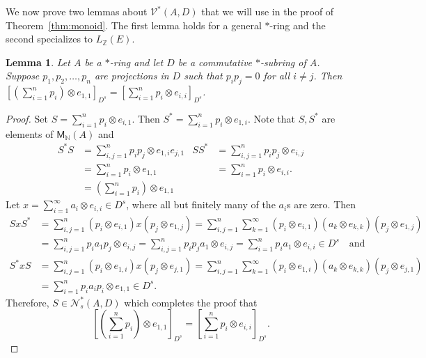 \documentclass[11pt, letterpaper,final]{amsart}
\newcommand{\ZZ}{\mathbb{Z}}
\newcommand{\NN}{\mathbb{N}}
\newcommand{\V}{\mathcal{V}}
\newtheorem{lem}[thm]{Lemma}
\theoremstyle{definition}
\theoremstyle{remark}
\begin{document}
We now prove two lemmas about $\V^*(A,D)$ that we will use in the proof of Theorem~\ref{thm:monoid}.  The first lemma holds for a general $*$-ring and the second specializes to $L_\ZZ(E)$.

\begin{lem}\label{lem:11todiag}
Let $A$ be a $*$-ring and let $D$ be a commutative $*$-subring of $A$.  Suppose $p_1, p_2, \ldots, p_n$ are projections in $D$ such that $p_i p_j = 0$ for all $i \neq j$.  Then $\left[ \left( \sum_{i=1}^n p_i \right) \otimes e_{1,1}\right]_{D^s}= \left[ \sum_{ i = 1}^n p_i \otimes e_{i, i}\right]_{D^s}$.   
\end{lem}

\begin{proof}
Set $S = \sum_{ i = 1}^n  p_i \otimes e_{i, 1}$.  Then $S^* =  \sum_{ i = 1}^n  p_i \otimes e_{1, i}$.  Note that $S, S^*$ are elements of $\mathsf{M}_{\NN}(A)$ and 
\begin{align*}
S^*S &= \sum_{ i, j = 1}^n p_i p_j \otimes e_{1,i} e_{j,1} & SS^* &= \sum_{ i, j = 1 }^n p_ip_j \otimes e_{i,j} \\
    &= \sum_{ i = 1}^n p_i \otimes e_{1,1}  & &= \sum_{ i = 1}^n p_i \otimes e_{i,i}. \\
    &= \left( \sum_{i=1}^n p_i \right) \otimes e_{1,1}
\end{align*}
Let $x = \sum_{ i = 1}^\infty a_i \otimes e_{i,i} \in D^s$, where all but finitely many of the $a_i$s are zero.  Then
\begin{align*}
S x S^* &= \sum_{i, j = 1}^n (p_i \otimes e_{i,1} ) x ( p_j \otimes e_{1,j} ) =  \sum_{ i , j = 1}^n \sum_{ k = 1}^\infty (p_i \otimes e_{i,1 } )(a_k \otimes e_{k,k}) (p_j \otimes e_{1,j})\\
        &= \sum_{i, j = 1}^n p_i a_1 p_j \otimes e_{i,j} = \sum_{ i, j=1}^n p_i p_j a_1 \otimes e_{i,j} = \sum_{ i =1}^n p_i a_1 \otimes e_{i, i} \in D^s \quad \text{and} \\
S^* x S &= \sum_{ i , j = 1}^n (p_i \otimes e_{1,i } )x(p_j \otimes e_{j,1}) = \sum_{ i , j = 1}^n \sum_{ k = 1}^\infty (p_i \otimes e_{1,i } )(a_k \otimes e_{k,k}) (p_j \otimes e_{j,1}) \\
        &= \sum_{ i = 1}^n p_i a_i p_i \otimes e_{1,1} \in D^s.
\end{align*}
Therefore, $S \in \mathcal{N}_s^*(A,D)$ which completes the proof that \[\left[ \left( \sum_{i=1}^n p_i \right) \otimes e_{1,1}\right]_{D^s}= \left[ \sum_{ i = 1}^n p_i \otimes e_{i, i}\right]_{D^s}.\]
\end{proof}
\end{document}
